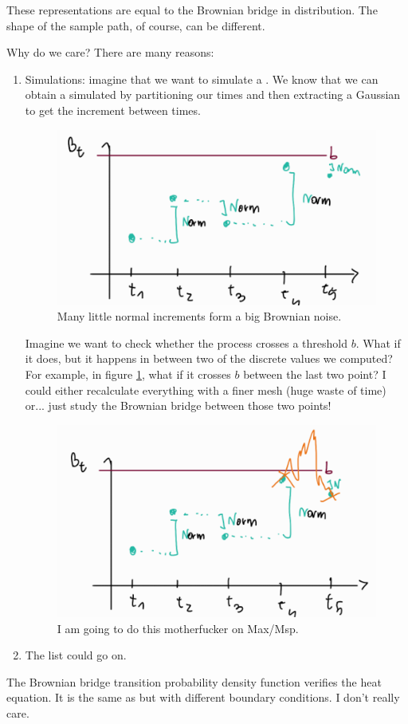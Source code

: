 \documentclass[12pt]{report}
\begin{document}
	These representations are equal to the Brownian bridge in distribution. The shape of the sample path, of course, can be different.\par
	Why do we care? There are many reasons:
	\begin{enumerate}
		\item Simulations: imagine that we want to simulate a \bwm. We know that we can obtain a simulated \bwm by partitioning our times and then extracting a Gaussian \rv{} to get the increment between times.
		\begin{figure}[h]
			\centering
			\includegraphics[width=0.5\linewidth]{img/screenshot038}
			\caption{Many little normal increments form a big Brownian noise.}
			\label{fig:screenshot038}
		\end{figure}
		Imagine we want to check whether the process crosses a threshold $b$. What if it does, but it happens in between two of the discrete values we computed? For example, in figure \ref{fig:screenshot038}, what if it crosses $b$ between the last two point? I could either recalculate everything with a finer mesh (huge waste of time) or... just study the Brownian bridge between those two points!
		\begin{figure}[h]
			\centering
			\includegraphics[width=0.5\linewidth]{img/screenshot039}
			\caption{I am going to do this motherfucker on Max/Msp.}
			\label{fig:screenshot039}
		\end{figure}
		\item The list could go on.
	\end{enumerate}
	\begin{remark}
		The Brownian bridge transition probability density function verifies the heat equation. It is the same as \bwm{} but with different boundary conditions. I don't really care.
	\end{remark}
\end{document}
